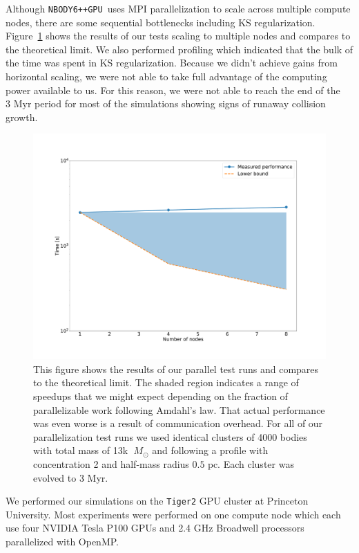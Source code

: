 \documentclass{princeton_astro_thesis}
\newcommand\Msun{\; M_\odot}
\newcommand\Myr{\mbox{ Myr}}
\newcommand\pc{\mbox{ pc}}
\newcommand\nbody{\texttt{NBODY6++GPU }}
\numberwithin{equation}{section}
\begin{document}
Although \nbody uses MPI parallelization to scale across multiple compute nodes, there are some sequential bottlenecks including KS regularization. Figure~\ref{fig:parallelperf} shows the results of our tests scaling to multiple nodes and compares to the theoretical limit.  We also performed profiling which indicated that the bulk of the time was spent in KS regularization. Because we didn't achieve gains from horizontal scaling, we were not able to take full advantage of the computing power available to us.  For this reason, we were not able to reach the end of the $3 \Myr$ period for most of the simulations showing signs of runaway collision growth.
\begin{figure}
\centering
\includegraphics[width=\textwidth]{parallelperformance}
\caption{This figure shows the results of our parallel test runs and compares to the theoretical limit.  The shaded region indicates a range of speedups that we might expect depending on the fraction of parallelizable work following Amdahl's law.  That actual performance was even worse is a result of communication overhead. For all of our parallelization test runs we used identical clusters of 4000 bodies with total mass of 13k $\Msun$ and following a \citet{1966King} profile with concentration 2 and half-mass radius $0.5 \pc$.  Each cluster was evolved to 3 Myr.}
\label{fig:parallelperf}
\end{figure}

We performed our simulations on the \texttt{Tiger2} GPU cluster at Princeton University. Most experiments were performed on one compute node which each use four NVIDIA Tesla P100 GPUs and 2.4 GHz Broadwell processors parallelized with OpenMP.
\end{document}
